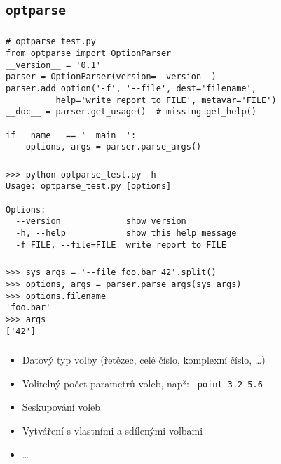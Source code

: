 \subsection{\texttt{optparse}}
\begin{frame}[fragile]
\frametitle{\insertsection}
\framesubtitle{\insertsubsection}

\begin{verbatim}
# optparse_test.py
from optparse import OptionParser
__version__ = '0.1'
parser = OptionParser(version=__version__)
parser.add_option('-f', '--file', dest='filename',
          help='write report to FILE', metavar='FILE')
__doc__ = parser.get_usage()  # missing get_help()

if __name__ == '__main__':
    options, args = parser.parse_args()
\end{verbatim}
\end{frame}

\begin{frame}[fragile]
\frametitle{\insertsection}
\framesubtitle{\insertsubsection}
\begin{verbatim}
>>> python optparse_test.py -h
Usage: optparse_test.py [options]

Options:
  --version             show version
  -h, --help            show this help message
  -f FILE, --file=FILE  write report to FILE

\end{verbatim}
\end{frame}

\begin{frame}[fragile]
\frametitle{\insertsection}
\framesubtitle{\insertsubsection}

\begin{verbatim}
>>> sys_args = '--file foo.bar 42'.split()
>>> options, args = parser.parse_args(sys_args)
>>> options.filename
'foo.bar'
>>> args
['42']
\end{verbatim}
\end{frame}

\begin{frame}[fragile]
\frametitle{\insertsection}
\framesubtitle{\insertsubsection}
\begin{itemize}[<+->]
\item Datový typ volby (řetězec, celé číslo, komplexní číslo, …)
\item Volitelný počet parametrů voleb, např: \texttt{--point 3.2 5.6}
\item Seskupování voleb
\item Vytváření  s vlastními a sdílenými volbami
\item …
\end{itemize}
\end{frame}
